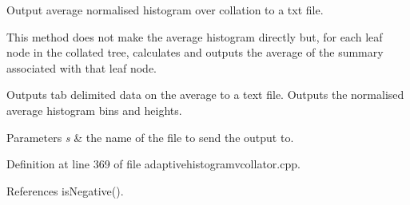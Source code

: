 \-Output average normalised histogram over collation to a txt file. 

\-This method does not make the average histogram directly but, for each leaf node in the collated tree, calculates and outputs the average of the summary associated with that leaf node.

\-Outputs tab delimited data on the average to a text file. \-Outputs the normalised average histogram bins and heights.


\begin{DoxyParams}{\-Parameters}
{\em s} & the name of the file to send the output to. \\
\hline
\end{DoxyParams}


\-Definition at line 369 of file adaptivehistogramvcollator.\-cpp.



\-References is\-Negative().


